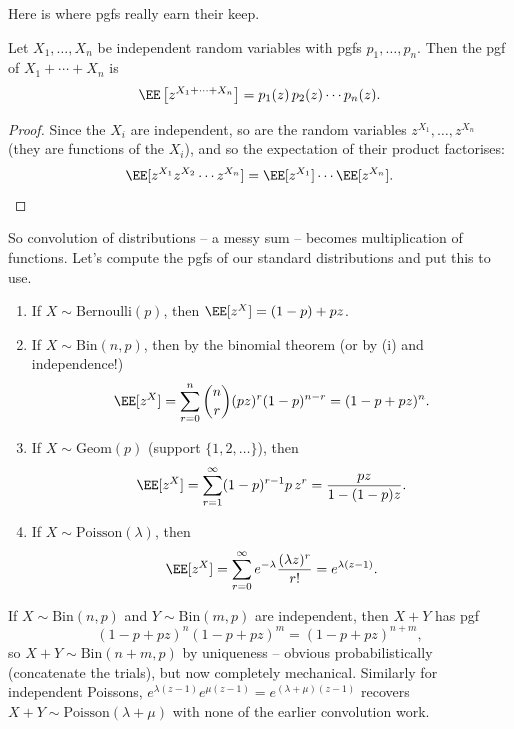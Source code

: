 Here is where pgfs really earn their keep.

\begin{theorem}
	Let $X_1, \dots, X_n$ be independent random variables with pgfs $p_1, \dots, p_n$. Then the pgf of $X_1 + \cdots + X_n$ is
	$$
	\EE\left[z^{X_1 + \cdots + X_n}\right] = p_1(z)\, p_2(z) \cdots p_n(z).
	$$
\end{theorem}
\begin{proof}
	Since the $X_i$ are independent, so are the random variables $z^{X_1}, \dots, z^{X_n}$ (they are functions of the $X_i$), and so the expectation of their product factorises:
	$$
	\EE[z^{X_1} z^{X_2} \cdots z^{X_n}] = \EE[z^{X_1}]\cdots\EE[z^{X_n}]. \qedhere
	$$
\end{proof}

So convolution of distributions -- a messy sum -- becomes multiplication of functions. Let's compute the pgfs of our standard distributions and put this to use.

\begin{example}
	\begin{enumerate}[label=(\roman*)]
		\item If $X \sim \mathrm{Bernoulli}(p)$, then $\EE[z^X] = (1-p) + pz$.
		\item If $X \sim \mathrm{Bin}(n, p)$, then by the binomial theorem (or by (i) and independence!)
		$$
		\EE[z^X] = \sum_{r=0}^{n}\binom{n}{r}(pz)^r (1-p)^{n - r} = (1 - p + pz)^n.
		$$
		\item If $X \sim \mathrm{Geom}(p)$ (support $\{1, 2, \dots\}$), then
		$$
		\EE[z^X] = \sum_{r = 1}^{\infty} (1-p)^{r-1}p \, z^r = \frac{pz}{1 - (1-p)z}.
		$$
		\item If $X \sim \mathrm{Poisson}(\lambda)$, then
		$$
		\EE[z^X] = \sum_{r = 0}^{\infty} e^{-\lambda}\frac{(\lambda z)^r}{r!} = e^{\lambda(z - 1)}.
		$$
	\end{enumerate}
\end{example}

\begin{example}
	If $X \sim \mathrm{Bin}(n, p)$ and $Y \sim \mathrm{Bin}(m, p)$ are independent, then $X + Y$ has pgf
	$$
	(1 - p + pz)^n (1 - p + pz)^m = (1 - p + pz)^{n + m},
	$$
	so $X + Y \sim \mathrm{Bin}(n + m, p)$ by uniqueness -- obvious probabilistically (concatenate the trials), but now completely mechanical. Similarly for independent Poissons, $e^{\lambda(z-1)}e^{\mu(z-1)} = e^{(\lambda + \mu)(z-1)}$ recovers $X + Y \sim \mathrm{Poisson}(\lambda + \mu)$ with none of the earlier convolution work.
\end{example}

